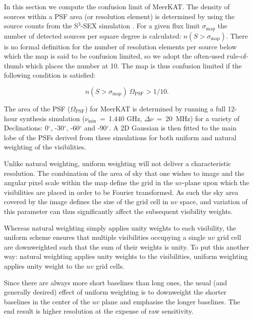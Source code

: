 \documentclass{aa}
\begin{document}
In this section we compute the confusion limit of MeerKAT. The density of sources within a PSF area (or resolution element) is determined by using the source counts from the S$^{3}$-SEX simulation \citep{Wilman-simulation}. For a given flux limit $\sigma_\mathrm{map}$ the number of detected sources per square degree is calculated: $n(S > \sigma_\mathrm{map})$. There is no formal definition for the number of resolution elements per source below which the map is said to be confusion limited, so we adopt the often-used rule-of-thumb which places the number at 10. The map is thus confusion limited if the following condition is satisfied:

\begin{equation}
n(S > \sigma_\mathrm{map})~\Omega_\mathrm{PSF} > 1 / 10.
\label{eq:conf_limit}
\end{equation}

The area of the PSF ($\Omega_\mathrm{PSF}$) for MeerKAT is determined by running a full 12-hour synthesis simulation ($\nu_\mathrm{min}$~=~1.440 GHz, $\Delta \nu$~=~20~MHz) for a variety of Declinations: 0$^{\circ}$, -30$^{\circ}$, -60$^{\circ}$ and -90$^{\circ}$. A 2D Gaussian is then fitted to the main lobe of the PSFs derived from these simulations for both uniform and natural weighting of the visibilities.

Unlike natural weighting, uniform weighting will not deliver a characteristic resolution. The combination of the area of sky that one wishes to image and the angular pixel scale within the map define the grid in the $uv$-plane upon which the visibilities are placed in order to be Fourier transformed. As such the sky area covered by the image defines the size of the grid cell in $uv$ space, and variation of this parameter can thus significantly affect the subsequent visibility weights.

Whereas natural weighting simply applies unity weights to each visibility, the uniform scheme ensures that multiple visibilities occupying a single $uv$ grid cell are downweighted such that the sum of their weights is unity. To put this another way: natural weighting applies unity weights to the visibilities, uniform weighting applies unity weight to the $uv$ grid cells.

Since there are always more short baselines than long ones, the usual (and generally desired) effect of uniform weighting is to downweight the shorter baselines in the center of the $uv$ plane and emphasise the longer baselines. The end result is higher resolution at the expense of raw sensitivity.
\end{document}
